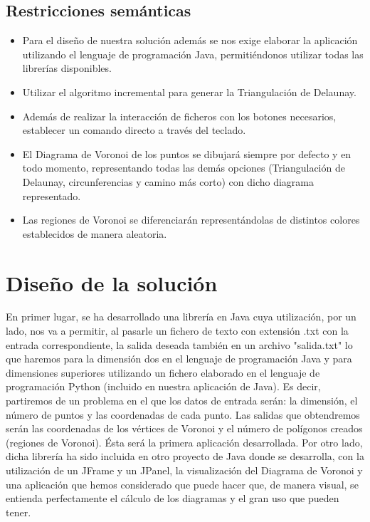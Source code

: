 \subsection{Restricciones semánticas}
\begin{itemize}
    \item[\ding{224}] Para el diseño de nuestra solución además se nos exige elaborar la aplicación utilizando el lenguaje de programación Java, permitiéndonos utilizar todas las librerías disponibles.
    \item[\ding{224}] Utilizar el algoritmo incremental para generar la Triangulación de Delaunay.
    \item[\ding{224}] Además de realizar la interacción de ficheros con los botones necesarios, establecer un comando directo a través del teclado.  
    \item[\ding{224}] El Diagrama de Voronoi de los puntos se dibujará siempre por defecto y en todo momento, representando todas las demás opciones (Triangulación de Delaunay, circunferencias y camino más corto) con dicho diagrama representado.
    \item[\ding{224}] Las regiones de Voronoi se diferenciarán representándolas de distintos colores establecidos de manera aleatoria.
\end{itemize}

    

\section{Diseño de la solución}

En primer lugar, se ha desarrollado una librería en Java cuya utilización, por un lado, nos va a permitir, al pasarle un fichero de texto con extensión .txt con la entrada correspondiente, la salida deseada también en un archivo "salida.txt" lo que haremos para la dimensión dos en el lenguaje de programación Java y para dimensiones superiores utilizando un fichero elaborado en el lenguaje de programación Python (incluido en nuestra aplicación de Java). Es decir, partiremos de un problema en el que los datos de entrada serán: la dimensión, el número de puntos y las coordenadas de cada punto. Las salidas que obtendremos serán las coordenadas de los vértices de Voronoi y el número de polígonos creados (regiones de Voronoi). Ésta será la primera aplicación desarrollada. Por otro lado, dicha librería ha sido incluida en otro proyecto de Java donde se desarrolla, con la utilización de un JFrame y un JPanel, la visualización del Diagrama de Voronoi y una aplicación que hemos considerado que puede hacer que, de manera visual, se entienda perfectamente el cálculo de los diagramas y el gran uso que pueden tener.
\vspace{0.3cm} 

